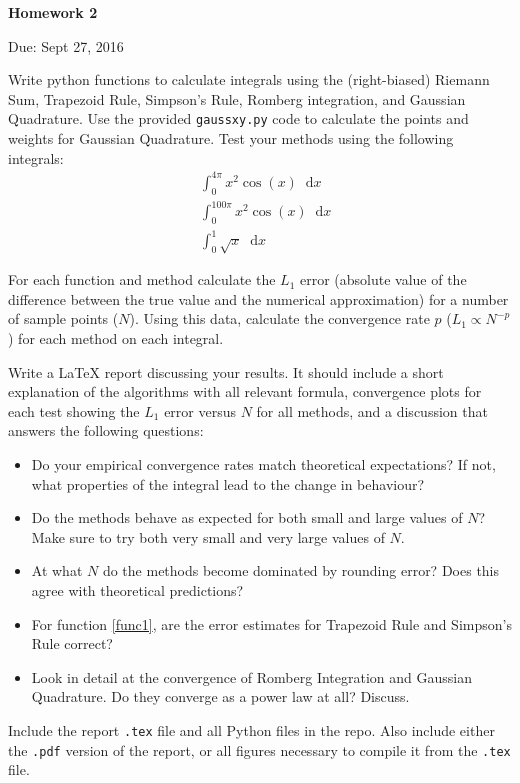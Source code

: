 \documentclass{article}
\newcommand*\diff{\mathop{}\!\mathrm{d}}
\begin{document}
\begin{center}

\vspace*{-2.5cm}
\LARGE
\bf{Homework 2}
\vspace{1cm}

\large{Due: Sept 27, 2016}
\vspace{1cm}

\end{center}

Write python functions to calculate integrals using the (right-biased) Riemann Sum, Trapezoid Rule, Simpson's Rule, Romberg integration, and Gaussian Quadrature.  Use the provided \texttt{gaussxy.py} code to calculate the points and weights for Gaussian Quadrature.  Test your methods using the following integrals:
\begin{align}
& \int_0^{4\pi} x^2 \cos(x) \diff x \label{func1}\\
& \int_0^{100\pi} x^2 \cos(x) \diff x \\
& \int_0^1 \sqrt{x} \diff x 
\end{align}

For each function and method calculate the $L_1$ error (absolute value of the difference between the true value and the numerical approximation) for a number of sample points ($N$).  Using this data, calculate the convergence rate $p$ ($L_1 \propto N^{-p}$) for each method on each integral.

Write a \LaTeX{}  report discussing your results. It should include a short explanation of the algorithms with all relevant formula, convergence plots for each test showing the $L_1$ error versus $N$ for all methods, and a discussion that answers the following questions:
\begin{itemize}
	\item Do your empirical convergence rates match theoretical expectations? If not, what properties of the integral lead to the change in behaviour?
	\item Do the methods behave as expected for both small and large values of $N$?  Make sure to try both very small and very large values of $N$.
	\item At what $N$ do the methods become dominated by rounding error?  Does this agree with theoretical predictions?
	\item For function \eqref{func1}, are the error estimates for Trapezoid Rule and Simpson's Rule correct?
	\item Look in detail at the convergence of Romberg Integration and Gaussian Quadrature. Do they converge as a power law at all? Discuss.
\end{itemize}

Include the report \texttt{.tex} file and all Python files in the repo.  Also include either the \texttt{.pdf} version of the report, or all figures necessary to compile it from the \texttt{.tex} file.
\end{document}
